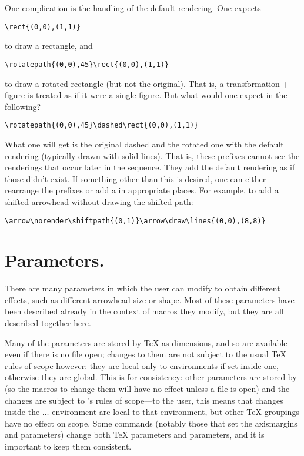 \documentclass[letterpaper]{article}
\begin{document}
One complication is the handling of the default rendering. One expects
\begin{verbatim}
\rect{(0,0),(1,1)}
\end{verbatim}
to draw a rectangle, and
\begin{verbatim}
\rotatepath{(0,0),45}\rect{(0,0),(1,1)}
\end{verbatim}
to draw a rotated rectangle (but not the original). That is, a
transformation + figure is treated as if it were a single figure. But
what would one expect in the following?
\begin{verbatim}
\rotatepath{(0,0),45}\dashed\rect{(0,0),(1,1)}
\end{verbatim}
What one will get is the original dashed and the rotated one with the
default rendering (typically drawn with solid lines). That is, these
prefixes cannot see the renderings that occur later in the sequence.
They add the default rendering as if those didn't exist. If something
other than this is desired, one can either rearrange the prefixes or add
a \label{norenderexample} in appropriate
places. For example, to add a shifted arrowhead without drawing the
shifted path:
\begin{verbatim}
\arrow\norender\shiftpath{(0,1)}\arrow\draw\lines{(0,0),(8,8)}
\end{verbatim}

\section{Parameters.}\label{parameters}

There are many parameters in \mfp{} which the user can modify to
obtain different effects, such as different arrowhead size or shape.
Most of these parameters have been described already in the context of
macros they modify, but they are all described together here.

Many of the parameters are stored by \TeX{} as dimensions, and so are
available even if there is no \MF{} file open; changes to them are not
subject to the usual \TeX{} rules of scope however: they are local
only to  environments if set inside one, otherwise
they are global. This is for consistency: other parameters are stored by
\MF{} (so the macros to change them will have no effect unless a \MF{}
file is open) and the changes are subject to \MF{}'s rules of scope---to
the \mfp{} user, this means that changes inside the  $\ldots$
 environment are local to that environment, but other
\TeX{} groupings have no effect on scope. Some commands (notably those
that set the axismargins and  parameters) change both \TeX{}
parameters and \MF{} parameters, and it is important to keep them
consistent.
\end{document}
